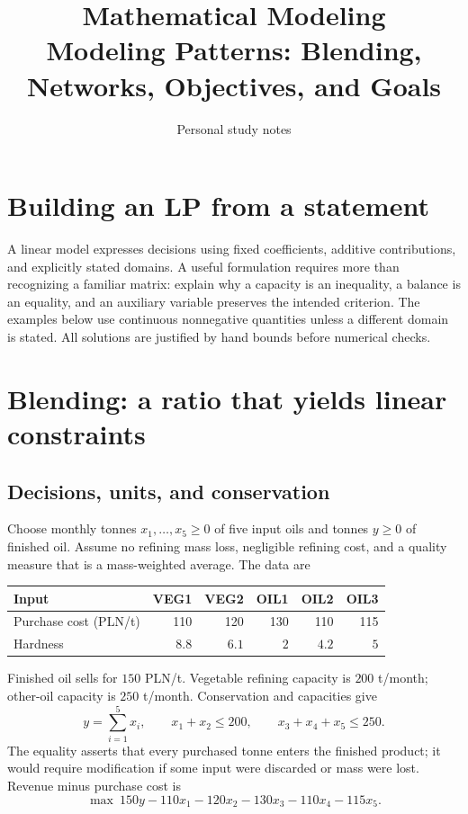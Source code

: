 \documentclass[11pt,a4paper]{article}
\title{\textbf{Mathematical Modeling}\\[2mm]
\large Modeling Patterns: Blending, Networks, Objectives, and Goals}
\author{Personal study notes}
\date{}
\begin{document}
\maketitle
\lecturelegend
{\small\tableofcontents}

\section{Building an LP from a statement}\label{sec:principles}
A linear model expresses decisions using fixed coefficients, additive contributions,
and explicitly stated domains. A useful formulation requires more than recognizing
a familiar matrix: explain why a capacity is an inequality, a balance is an equality,
and an auxiliary variable preserves the intended criterion. The examples below
use continuous nonnegative quantities unless a different domain is stated.
All solutions are justified by hand bounds before numerical checks.

\section{Blending: a ratio that yields linear constraints}\label{sec:blending}
\subsection{Decisions, units, and conservation}
Choose monthly tonnes $x_1,\ldots,x_5\geq0$ of five input oils and tonnes
$y\geq0$ of finished oil. Assume no refining mass loss, negligible refining cost,
and a quality measure that is a mass-weighted average. The data are
\begin{center}
  \begin{tabular}{lrrrrr}\toprule
    Input & VEG1 & VEG2 & OIL1 & OIL2 & OIL3\\\midrule
    Purchase cost (PLN/t) & 110 & 120 & 130 & 110 & 115\\
    Hardness & $8.8$ & $6.1$ & $2$ & $4.2$ & $5$\\\bottomrule
  \end{tabular}
\end{center}
Finished oil sells for $150$ PLN/t. Vegetable refining capacity is $200$ t/month;
other-oil capacity is $250$ t/month. Conservation and capacities give
\[
  y=\sum_{i=1}^5x_i,\qquad x_1+x_2\leq200,\qquad x_3+x_4+x_5\leq250.
\]
The equality asserts that every purchased tonne enters the finished product;
it would require modification if some input were discarded or mass were lost.
Revenue minus purchase cost is
\[
  \max\ 150y-110x_1-120x_2-130x_3-110x_4-115x_5.
\]
\end{document}
